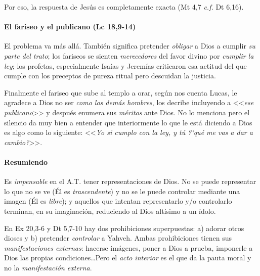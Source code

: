 Por eso, la respuesta de Jes\'us es completamente exacta (Mt 4,7 \emph{c.f.} Dt 6,16).

\paragraph{El fariseo y el publicano (Lc 18,9-14)}

El problema va m\'as all\'a. Tambi\'en significa pretender \emph{obligar} a Dios a cumplir \emph{su parte del trato}; los fariseos se sienten \emph{merecedores} del favor divino por \emph{cumplir la ley}; los profetas, especialmente Isa\'{i}as y Jerem\'{i}as criticaron esa actitud del que cumple con los preceptos de pureza ritual pero descuidan la justicia.

Finalmente el fariseo que sube al templo a orar, seg\'un nos cuenta Lucas, le agradece a Dios no ser \emph{como los dem\'as hombres}, los decribe incluyendo a <<\emph{ese publicano}>> y despu\'es enumera sus \emph{m\'eritos} ante Dios. No lo menciona pero el silencio da muy bien a entender que interiormente lo que le est\'a diciendo a Dios es algo como lo siguiente: <<\emph{Yo si cumplo con la ley, y t\'u ?`qu\'e me vas a dar a cambio?}>>.

\paragraph{Resumiendo}

Es \emph{impensable} en el A.T. tener representaciones de Dios. No se puede representar lo que no se ve (\'El es \emph{trascendente}) y no se le puede controlar mediante una imagen (\'El es \emph{libre}); y aquellos que intentan representarlo y/o controlarlo terminan, en su imaginaci\'on, reduciendo al Dios alt\'{i}simo a un \'{i}dolo.

En Ex 20,3-6 y Dt 5,7-10 hay dos prohibiciones superpuestas: a) adorar otros dioses y b) pretender \emph{controlar} a Yahveh. Ambas prohibiciones tienen sus \emph{manifestaciones externas}: hacerse im\'agenes, poner a Dios a prueba, imponerle a Dios las propias condiciones\ldots Pero el \emph{acto interior} es el que da la pauta moral y no la \emph{manifestaci\'on externa}.
